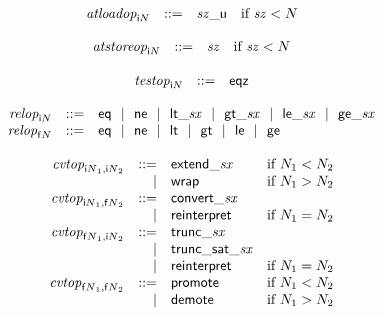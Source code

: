 $$
\begin{array}[t]{@{}lrrl@{}l@{}}
& {{\mathit{atloadop}}}_{{\mathsf{i}}{N}} & ::= & {{\mathit{sz}}}{\mathsf{\_}}{\mathsf{u}} & \quad \mbox{if}~ {\mathit{sz}} < N \\
\end{array}
$$

$$
\begin{array}[t]{@{}lrrl@{}l@{}}
& {{\mathit{atstoreop}}}_{{\mathsf{i}}{N}} & ::= & {\mathit{sz}} & \quad \mbox{if}~ {\mathit{sz}} < N \\
\end{array}
$$

$$
\begin{array}[t]{@{}lrrl@{}l@{}}
& {{\mathit{testop}}}_{{\mathsf{i}}{N}} & ::= & \mathsf{eqz} \\
\end{array}
$$

$$
\begin{array}[t]{@{}lrrl@{}l@{}}
& {{\mathit{relop}}}_{{\mathsf{i}}{N}} & ::= & \mathsf{eq} ~~|~~ \mathsf{ne} ~~|~~ {\mathsf{lt}}{\mathsf{\_}}{{\mathit{sx}}} ~~|~~ {\mathsf{gt}}{\mathsf{\_}}{{\mathit{sx}}} ~~|~~ {\mathsf{le}}{\mathsf{\_}}{{\mathit{sx}}} ~~|~~ {\mathsf{ge}}{\mathsf{\_}}{{\mathit{sx}}} \\
& {{\mathit{relop}}}_{{\mathsf{f}}{N}} & ::= & \mathsf{eq} ~~|~~ \mathsf{ne} ~~|~~ \mathsf{lt} ~~|~~ \mathsf{gt} ~~|~~ \mathsf{le} ~~|~~ \mathsf{ge} \\
\end{array}
$$

$$
\begin{array}[t]{@{}lrrl@{}l@{}}
& {{\mathit{cvtop}}}_{{{\mathsf{i}}{N}}_1, {{\mathsf{i}}{N}}_2} & ::= & {\mathsf{extend}}{\mathsf{\_}}{{\mathit{sx}}} & \quad \mbox{if}~ N_1 < N_2 \\
& & | & \mathsf{wrap} & \quad \mbox{if}~ N_1 > N_2 \\
& {{\mathit{cvtop}}}_{{{\mathsf{i}}{N}}_1, {{\mathsf{f}}{N}}_2} & ::= & {\mathsf{convert}}{\mathsf{\_}}{{\mathit{sx}}} \\
& & | & \mathsf{reinterpret} & \quad \mbox{if}~ N_1 = N_2 \\
& {{\mathit{cvtop}}}_{{{\mathsf{f}}{N}}_1, {{\mathsf{i}}{N}}_2} & ::= & {\mathsf{trunc}}{\mathsf{\_}}{{\mathit{sx}}} \\
& & | & {\mathsf{trunc\_sat}}{\mathsf{\_}}{{\mathit{sx}}} \\
& & | & \mathsf{reinterpret} & \quad \mbox{if}~ N_1 = N_2 \\
& {{\mathit{cvtop}}}_{{{\mathsf{f}}{N}}_1, {{\mathsf{f}}{N}}_2} & ::= & \mathsf{promote} & \quad \mbox{if}~ N_1 < N_2 \\
& & | & \mathsf{demote} & \quad \mbox{if}~ N_1 > N_2 \\
\end{array}
$$

